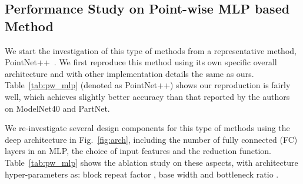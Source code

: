 \documentclass[runningheads]{llncs}
\begin{document}
\subsection{Performance Study on Point-wise MLP based Method}

\label{sec.benchmark_mlp}

We start the investigation of this type of methods from a representative method, PointNet++~\cite{qi2017pointnet++}. We first reproduce this method using its own specific overall architecture and with other implementation details the same as ours. Table~\ref{tab:pw_mlp} (denoted as PointNet++) shows our reproduction is fairly well, which achieves slightly better accuracy than that reported by the authors~\cite{qi2017pointnet++,mo2019partnet} on ModelNet40 and PartNet.

We re-investigate several design components for this type of methods using the deep architecture in Fig.~\ref{fig:arch}, including the number of fully connected (FC) layers in an MLP, the choice of input features and the reduction function. Table~\ref{tab:pw_mlp} shows the ablation study on these aspects, with architecture hyper-parameters as: block repeat factor , base width  and bottleneck ratio .
\end{document}
